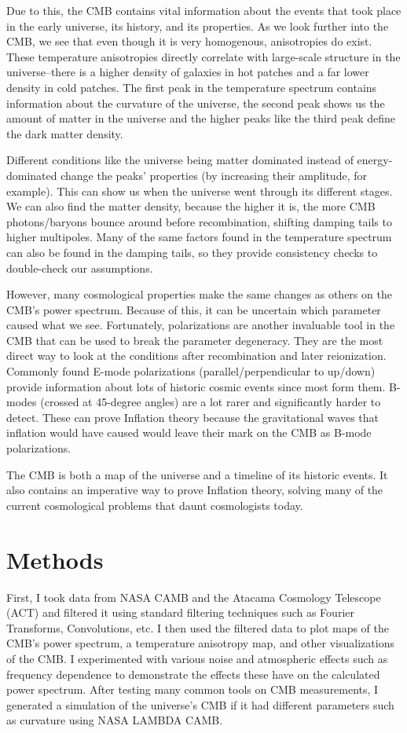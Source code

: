 \documentclass[12pt]{article}
\begin{document}
Due to this, the CMB contains vital information about the events that took place in the early universe, its history, and its properties. As we look further into the CMB, we see that even though it is very homogenous, anisotropies do exist. These temperature anisotropies directly correlate with large-scale structure in the universe–there is a higher density of galaxies in hot patches and a far lower density in cold patches. The first peak in the temperature spectrum contains information about the curvature of the universe, the second peak shows us the amount of matter in the universe and the higher peaks like the third peak define the dark matter density. 

Different conditions like the universe being matter dominated instead of energy-dominated change the peaks’ properties (by increasing their amplitude, for example). This can show us when the universe went through its different stages. We can also find the matter density, because the higher it is, the more CMB photons/baryons bounce around before recombination, shifting damping tails to higher multipoles. Many of the same factors found in the temperature spectrum can also be found in the damping tails, so they provide consistency checks to double-check our assumptions.

However, many cosmological properties make the same changes as others on the CMB’s power spectrum. Because of this, it can be uncertain which parameter caused what we see. Fortunately, polarizations are another invaluable tool in the CMB that can be used to break the parameter degeneracy. They are the most direct way to look at the conditions after recombination and later reionization. Commonly found E-mode polarizations (parallel/perpendicular to up/down) provide information about lots of historic cosmic events since most form them. B-modes (crossed at 45-degree angles) are a lot rarer and significantly harder to detect. These can prove Inflation theory because the gravitational waves that inflation would have caused would leave their mark on the CMB as B-mode polarizations. 

The CMB is both a map of the universe and a timeline of its historic events. It also contains an imperative way to prove Inflation theory, solving many of the current cosmological problems that daunt cosmologists today.

\section{Methods}
First, I took data from NASA CAMB and the Atacama Cosmology Telescope (ACT) and filtered it using standard filtering techniques such as Fourier Transforms, Convolutions, etc. I then used the filtered data to plot maps of the CMB’s power spectrum, a temperature anisotropy map, and other visualizations of the CMB. I experimented with various noise and atmospheric effects such as frequency dependence to demonstrate the effects these have on the calculated power spectrum. After testing many common tools on CMB measurements, I generated a simulation of the universe’s CMB if it had different parameters such as curvature using NASA LAMBDA CAMB.
\end{document}
